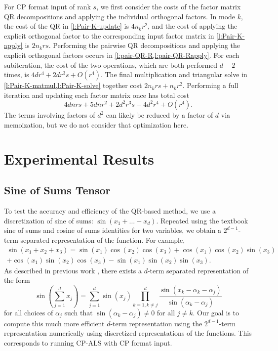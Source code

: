 \documentclass{article}
\begin{document}
For CP format input of rank $s$, we first consider the costs of the factor matrix QR decompositions and applying the individual orthogonal factors.
In mode $k$, the cost of the QR in \cref{l:Pair-K-update} is $4n_kr^2$, and the cost of applying the explicit orthogonal factor to the corresponding input factor matrix in \cref{l:Pair-K-apply} is $2n_krs$.
Performing the pairwise QR decompositions and applying the explicit orthogonal factors occurs in \cref{l:pair-QR-R,l:pair-QR-Rapply}.
For each subiteration, the cost of the two operations, which are both performed $d-2$ times, is $4dr^4+2dr^3s+O(r^4)$.
The final multiplication and triangular solve in \cref{l:Pair-K-matmul,l:Pair-K-solve} together cost $2n_krs+n_kr^2$.
Performing a full iteration and updating each factor matrix once has total cost
$$ 4d\bar{n}rs + 5d\bar{n}r^2 + 2d^2r^3s + 4d^2r^4 + O(r^4). $$
The terms involving factors of $d^2$ can likely be reduced by a factor of $d$ via memoization, but we do not consider that optimization here.

\section{Experimental Results} 
\label{sec:result}


\subsection{Sine of Sums Tensor}

To test the accuracy and efficiency of the QR-based method, we use a discretization of sine of sums: $\sin(x_1+\dots+ x_d)$.
Repeated using the textbook sine of sums and cosine of sums identities for two variables, we obtain a $2^{d-1}$-term separated representation of the function.
For example, 
\begin{equation*}
\begin{split}
\sin(x_1+x_2+x_3) = \sin(x_1)\cos(x_2)\cos(x_3)+\cos(x_1)\cos(x_2)\sin(x_3) \\
+\cos(x_1)\sin(x_2)\cos(x_3) - \sin(x_1)\sin(x_2)\sin(x_3).
\end{split}
\end{equation*}
As described in previous work \cite{BM02,MVLB23}, there exists a $d$-term separated representation of the form
\begin{equation}
\label{eq:dtermrep}
\sin\left(\sum^d_{j=1}x_j\right) = \sum^d_{j=1}\sin(x_j)\prod^d_{k=1,k\neq j}\frac{\sin(x_k - \alpha_k -\alpha_j)}{\sin(\alpha_k - \alpha_j)}
\end{equation}
for all choices of  ${\alpha_j}$ such that $\sin(\alpha_k - \alpha_j) \neq 0$ for all $j \neq k$.
Our goal is to compute this much more efficient $d$-term representation using the $2^{d-1}$-term representation numerically using discretized representations of the functions.
This corresponds to running CP-ALS with CP format input.
\end{document}
